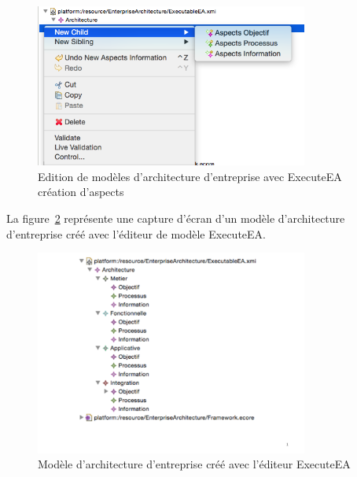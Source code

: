     \begin{figure}[!htbp]
     \begin{center}
      \includegraphics[width=0.8\textwidth]{figures/5_implementation/editeur_modele2.png}
     \end{center}
     \caption{Edition de modèles d'architecture d'entreprise avec ExecuteEA\\création d'aspects}
     \label{fig:editeur_modele2}
    \end{figure}

    La figure~\ref{fig:modeleEA} représente une capture d'écran d'un modèle d'architecture d'entreprise créé avec l'éditeur de modèle ExecuteEA.

    \begin{figure}[!htbp]
     \begin{center}
      \includegraphics[trim=0cm 3cm 0cm 0cm, width=0.8\textwidth]{figures/5_implementation/modele_ea.pdf}
     \end{center}
     \caption{Modèle d'architecture d'entreprise créé avec l'éditeur ExecuteEA}
     \label{fig:modeleEA}
    \end{figure}

